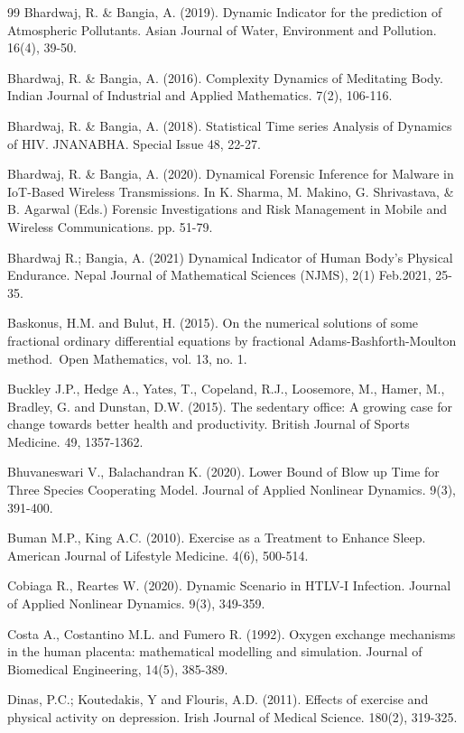 \documentclass[10pt]{NSP1}
\begin{document}
\begin{thebibliography}{99}
Bhardwaj, R. \& Bangia, A. (2019). Dynamic Indicator for the prediction of Atmospheric Pollutants. Asian Journal of Water, Environment and Pollution. 16(4), 39-50.

Bhardwaj, R. \& Bangia, A. (2016). Complexity Dynamics of Meditating Body. Indian Journal of Industrial and Applied Mathematics. 7(2), 106-116.

Bhardwaj, R. \& Bangia, A. (2018). Statistical Time series Analysis of Dynamics of HIV. JNANABHA. Special Issue 48, 22-27.

Bhardwaj, R. \& Bangia, A. (2020). Dynamical Forensic Inference for Malware in IoT-Based Wireless Transmissions. In K. Sharma, M. Makino, G. Shrivastava, \& B. Agarwal (Eds.) Forensic Investigations and Risk Management in Mobile and Wireless Communications. pp. 51-79.

Bhardwaj R.; Bangia, A. (2021) Dynamical Indicator of Human Body’s Physical Endurance. Nepal Journal of Mathematical Sciences (NJMS), 2(1) Feb.2021, 25-35.

Baskonus, H.M. and Bulut, H. (2015). On the numerical solutions of some fractional ordinary differential equations by fractional Adams-Bashforth-Moulton method. Open Mathematics, vol. 13, no. 1.

Buckley J.P., Hedge A., Yates, T., Copeland, R.J., Loosemore, M., Hamer, M., Bradley, G. and Dunstan, D.W. (2015). The sedentary office: A growing case for change towards better health and productivity. British Journal of Sports Medicine. 49, 1357-1362.

Bhuvaneswari V., Balachandran K. (2020). Lower Bound of Blow up Time for Three Species Cooperating Model. Journal of Applied Nonlinear Dynamics. 9(3), 391-400.

Buman M.P., King A.C. (2010). Exercise as a Treatment to Enhance Sleep. American Journal of Lifestyle Medicine. 4(6), 500-514.

Cobiaga R., Reartes W. (2020). Dynamic Scenario in HTLV-I Infection. Journal of Applied Nonlinear Dynamics. 9(3), 349-359.

Costa A., Costantino M.L. and Fumero R. (1992). Oxygen exchange mechanisms in the human placenta: mathematical modelling and simulation. Journal of Biomedical Engineering, 14(5), 385-389.

Dinas, P.C.; Koutedakis, Y and Flouris, A.D. (2011). Effects of exercise and physical activity on depression. Irish Journal of Medical Science. 180(2), 319-325.


\end{thebibliography}
\end{document}
